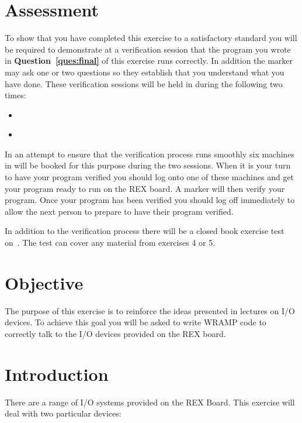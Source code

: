 \documentclass[a4paper,10pt]{article}
\begin{document}



\section{Assessment}

To show that you have completed this exercise to a satisfactory
standard you will be required to demonstrate at a verification session
that the program you wrote in \textbf{Question~\ref{ques:final}} of this exercise
runs correctly. In addition the marker may ask one or two questions so
they establish that you understand what you have done.  These
verification sessions will be held in \ASSESSROOM during the following two
times: 

\begin{itemize}
\item \IODUE~\MORNINGASSESS
\item \IODUE~\AFTERNOONASSESS
\end{itemize}

In an attempt to ensure that the verification process runs smoothly
six machines in \ASSESSROOM will be booked for this purpose during the two
sessions. When it is your turn to have your program verified you
should log onto one of these machines and get your program ready to
run on the REX board. A marker will then verify your program. Once
your program has been verified you should log off immediately to allow
the next person to prepare to have their program verified.

In addition to the verification process there will be a closed book
exercise test on~\textbf{\TESTTWO}. The test can cover any material
from exercises 4 or 5.

\section{Objective}

The purpose of this exercise is to reinforce the ideas presented in
lectures on I/O devices. To achieve this goal you will be asked to
write WRAMP code to correctly talk to the I/O devices provided on the
REX board.

\section{Introduction}
There are a range of I/O systems provided on the REX Board. This
exercise will deal with two particular devices:
\end{document}
